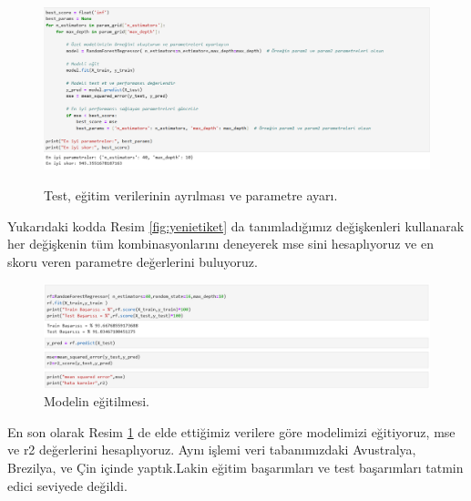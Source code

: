 \documentclass[12pt, a4paper]{article}
\begin{document}
\begin{figure}[!htbp] 
	
	\centering
	\includegraphics[angle=0, width=\textwidth]{11.png}
	\label{fig:yenietiket2}
	\caption{Test, eğitim verilerinin ayrılması ve parametre ayarı.}
\end{figure}
Yukarıdaki kodda Resim \ref{fig:yenietiket} da tanımladığımız değişkenleri kullanarak her değişkenin tüm kombinasyonlarını deneyerek mse sini hesaplıyoruz ve en skoru veren parametre değerlerini buluyoruz.


\begin{figure}[!htbp] 
	
	\centering
	\includegraphics[angle=0, width=\textwidth]{13.png}
	\caption{Modelin eğitilmesi.}
\end{figure}
\newpage
En son olarak Resim \ref{fig:yenietiket2} de elde ettiğimiz verilere göre modelimizi eğitiyoruz, mse ve r2 değerlerini hesaplıyoruz.
\newline
\newline
Aynı işlemi veri tabanımızdaki Avustralya, Brezilya, ve Çin içinde yaptık.Lakin eğitim başarımları ve test başarımları tatmin edici seviyede değildi.
\end{document}
